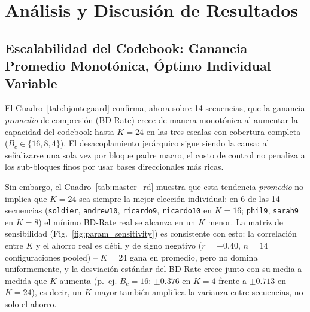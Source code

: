 \documentclass[11pt,a4paper]{article}
\begin{document}



\section{Análisis y Discusión de Resultados}

\subsection{Escalabilidad del Codebook: Ganancia Promedio Monotónica, Óptimo Individual Variable}
El Cuadro~\ref{tab:bjontegaard} confirma, ahora sobre 14 secuencias, que la ganancia \emph{promedio} de compresión (BD-Rate) crece de manera monotónica al aumentar la capacidad del codebook hasta $K=24$ en las tres escalas con cobertura completa ($B_c\in\{16,8,4\}$). El desacoplamiento jerárquico sigue siendo la causa: al señalizarse una sola vez por bloque padre macro, el costo de control no penaliza a los sub-bloques finos por usar bases direccionales más ricas.

Sin embargo, el Cuadro~\ref{tab:master_rd} muestra que esta tendencia \emph{promedio} no implica que $K=24$ sea siempre la mejor elección individual: en 6 de las 14 secuencias (\texttt{soldier}, \texttt{andrew10}, \texttt{ricardo9}, \texttt{ricardo10} en $K=16$; \texttt{phil9}, \texttt{sarah9} en $K=8$) el mínimo BD-Rate real se alcanza en un $K$ menor. La matriz de sensibilidad (Fig.~\ref{fig:param_sensitivity}) es consistente con esto: la correlación entre $K$ y el ahorro real es débil y de signo negativo ($r=-0.40$, $n=14$ configuraciones pooled) -- $K=24$ gana en promedio, pero no domina uniformemente, y la desviación estándar del BD-Rate crece junto con su media a medida que $K$ aumenta (p.~ej. $B_c=16$: $\pm0.376$ en $K=4$ frente a $\pm0.713$ en $K=24$), es decir, un $K$ mayor también amplifica la varianza entre secuencias, no solo el ahorro.
\end{document}
